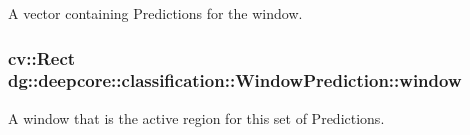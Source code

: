 A vector containing Predictions for the window. 

\subsubsection[{\texorpdfstring{window}{window}}]{\setlength{\rightskip}{0pt plus 5cm}cv\+::\+Rect dg\+::deepcore\+::classification\+::\+Window\+Prediction\+::window}\hypertarget{group___classification_module_ga200902328358f2246a5e62d390e57278}{}\label{group___classification_module_ga200902328358f2246a5e62d390e57278}


A window that is the active region for this set of Predictions. 

